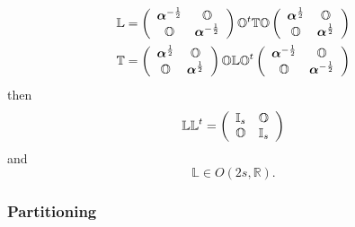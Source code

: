\documentclass[aps,preprint]{revtex4}%
\begin{document}
\begin{align}
\mathbb{L}  &  =\left(
\begin{array}
[c]{cc}%
\boldsymbol{\alpha}^{-\frac{1}{2}} & \mathbb{O}\\
\mathbb{O} & \boldsymbol{\alpha}^{-\frac{1}{2}}%
\end{array}
\right)  \mathbb{O}^{t}\mathbb{TO}\left(
\begin{array}
[c]{cc}%
\boldsymbol{\alpha}^{\frac{1}{2}} & \mathbb{O}\\
\mathbb{O} & \boldsymbol{\alpha}^{\frac{1}{2}}%
\end{array}
\right) \\
\mathbb{T}  &  =\left(
\begin{array}
[c]{cc}%
\boldsymbol{\alpha}^{\frac{1}{2}} & \mathbb{O}\\
\mathbb{O} & \boldsymbol{\alpha}^{\frac{1}{2}}%
\end{array}
\right)  \mathbb{OLO}^{t}\left(
\begin{array}
[c]{cc}%
\boldsymbol{\alpha}^{-\frac{1}{2}} & \mathbb{O}\\
\mathbb{O} & \boldsymbol{\alpha}^{-\frac{1}{2}}%
\end{array}
\right)
\end{align}
then
\begin{equation}
\mathbb{LL}^{t}=\left(
\begin{array}
[c]{cc}%
\mathbb{I}_{s} & \mathbb{O}\\
\mathbb{O} & \mathbb{I}_{s}%
\end{array}
\right)
\end{equation}
and
\begin{equation}
\mathbb{L\in}O\left(  2s,\mathbb{R}\right)  .
\end{equation}


\subsubsection{Partitioning}
\end{document}
